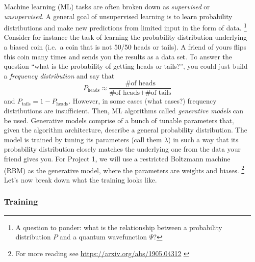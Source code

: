 \documentclass[12pt]{article}
\begin{document}
Machine learning (ML) tasks are often broken down as {\it supervised} or {\it unsupervised}.  A general goal of unsupervised learning is
to learn probability distributions and make new predictions from limited input in the form of data.
\footnote{A question to ponder: what is the relationship between a probability distribution $P$ and a quantum wavefunction $\Psi$?}
Consider for instance the task of learning the probability distribution underlying
a biased coin (i.e.~a coin that is not 50/50 heads or tails). A friend of yours flips this coin many times and sends you the results as a data set.
To answer the question ``what is the probability of getting heads or tails?'', you could just build a {\it frequency distribution} and say that
$$
    P_{\text{heads}} \approx \frac{\text{\# of heads}}{\text{\# of heads} + \text{\# of tails}}
$$
and $ P_{\text{tails}} = 1 - P_{\text{heads}}$.  However, in some cases (what cases?) frequency distributions are insufficient.  Then, ML algorithms called {\it generative
        models} can be used. Generative models comprise of a bunch of tunable parameters that, given the algorithm architecture, describe a general probability distribution.
The model is trained by tuning its parameters (call them $\lambda$) in such a way that its probability distribution closely matches the underlying one from the data your friend gives you.
For Project 1, we will use a restricted Boltzmann machine (RBM) as the generative model, where the parameters are weights and biases.
\footnote{For more reading see \textcolor{blue}{ \href{https://arxiv.org/abs/1905.04312}{https://arxiv.org/abs/1905.04312} }}
Let's now break down what the training looks like.

\subsubsection{Training}
\end{document}
